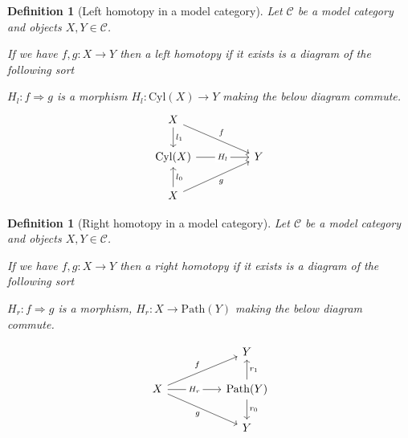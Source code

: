 \documentclass[12pt]{report}
\numberwithin{equation}{section}
\newtheorem{definition}[dummy]{Definition}
\begin{document}
	
	\begin{definition}[Left homotopy in a model category]
		Let $\mathcal{C}$ be a model category and objects $X,Y \in \mathcal{C}$.
		
		If we have \( f, g: X \to Y \) then a left homotopy if it exists is a diagram of the following sort 
		
		\( H_l: f \Rightarrow g \) is a morphism \( H_l: \mathrm{Cyl}(X) \to Y \) making the below diagram commute.
		\[\begin{tikzcd}
			X \\
			{\mathrm{Cyl}(X)} && Y \\
			X
			\arrow["{l_1}", from=1-1, to=2-1]
			\arrow["f", from=1-1, to=2-3]
			\arrow["{H_l}"{description}, from=2-1, to=2-3]
			\arrow["{l_0}"', from=3-1, to=2-1]
			\arrow["g"', from=3-1, to=2-3]
		\end{tikzcd}\]
		
	\end{definition}
	\begin{definition}[Right homotopy in a model category]
		Let $\mathcal{C}$ be a model category and objects $X,Y \in \mathcal{C}$.
		
		If we have \( f, g: X \to Y \) then a right homotopy if it exists is a diagram of the following sort 
		
		\( H_r: f \Rightarrow g \) is a morphism, \( H_r: X \to \mathrm{Path}(Y) \) making the below diagram commute.
	
		\[\begin{tikzcd}
			&& Y \\
			X && {\mathrm{Path}(Y)} \\
			&& Y
			\arrow["{r_1}"', from=2-3, to=1-3]
			\arrow["f", from=2-1, to=1-3]
			\arrow["{H_r}"{description}, from=2-1, to=2-3]
			\arrow["g"', from=2-1, to=3-3]
			\arrow["{r_0}", from=2-3, to=3-3]
		\end{tikzcd}\]
	\end{definition}
	
\end{document}
